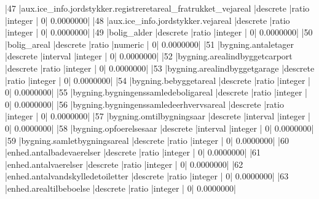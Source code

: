 \documentclass{report}
\begin{document}
\begin{Schunk}
\begin{Soutput}
|47  |aux.ice_info.jordstykker.registreretareal_fratrukket_vejareal |descrete           |ratio          |integer         |              0|          0.0000000|
|48  |aux.ice_info.jordstykker.vejareal                             |descrete           |ratio          |integer         |              0|          0.0000000|
|49  |bolig_alder                                                   |descrete           |ratio          |integer         |              0|          0.0000000|
|50  |bolig_areal                                                   |descrete           |ratio          |numeric         |              0|          0.0000000|
|51  |bygning.antaletager                                           |descrete           |interval       |integer         |              0|          0.0000000|
|52  |bygning.arealindbyggetcarport                                 |descrete           |ratio          |integer         |              0|          0.0000000|
|53  |bygning.arealindbyggetgarage                                  |descrete           |ratio          |integer         |              0|          0.0000000|
|54  |bygning.bebyggetareal                                         |descrete           |ratio          |integer         |              0|          0.0000000|
|55  |bygning.bygningenssamledeboligareal                           |descrete           |ratio          |integer         |              0|          0.0000000|
|56  |bygning.bygningenssamledeerhvervsareal                        |descrete           |ratio          |integer         |              0|          0.0000000|
|57  |bygning.omtilbygningsaar                                      |descrete           |interval       |integer         |              0|          0.0000000|
|58  |bygning.opfoerelsesaar                                        |descrete           |interval       |integer         |              0|          0.0000000|
|59  |bygning.samletbygningsareal                                   |descrete           |ratio          |integer         |              0|          0.0000000|
|60  |enhed.antalbadevaerelser                                      |descrete           |ratio          |integer         |              0|          0.0000000|
|61  |enhed.antalvaerelser                                          |descrete           |ratio          |integer         |              0|          0.0000000|
|62  |enhed.antalvandskylledetoiletter                              |descrete           |ratio          |integer         |              0|          0.0000000|
|63  |enhed.arealtilbeboelse                                        |descrete           |ratio          |integer         |              0|          0.0000000|

\end{Soutput}
\end{Schunk}
\end{document}
